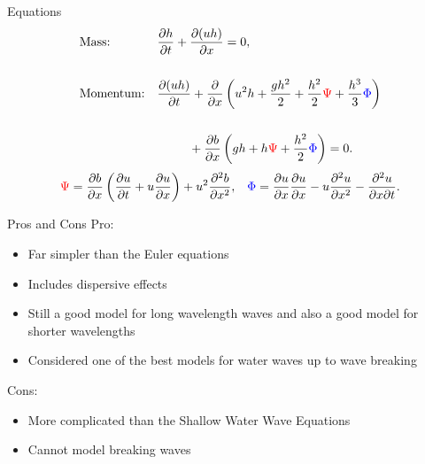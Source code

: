 \documentclass[handout]{beamer}
\begin{document}
\begin{frame}{Equations}
	\begin{subequations}
		\begin{align*}
		&\text{Mass:} && \frac{\partial h}{\partial t} + \dfrac{\partial (uh)}{\partial x} = 0,  \\ \\
		&\text{Momentum:} &&\dfrac{\partial (uh)}{\partial t} + \dfrac{\partial}{\partial x} \left ( u^2h + \dfrac{gh^2}{2} + \dfrac{h^2}{2}{ \color{red}\Psi } + \dfrac{h^3}{3}{ { \color{blue} \Phi } }  \right )   \\ \\& &&\quad \quad \; \; +  \dfrac{\partial b}{\partial x} \left (gh +   h { \color{red}\Psi } + \dfrac{h^2}{2}{ { \color{blue} \Phi } }  \right ) = 0.
		\end{align*}
	\end{subequations}
		\begin{align*}
		&{ \color{red}\Psi }  = \dfrac{\partial b}{\partial x}\left(\dfrac{\partial u}{\partial t} + u\dfrac{\partial u}{\partial x} \right)  + u^2\dfrac{\partial^2 b}{\partial x^2}, &
		{ \color{blue} \Phi }  = \dfrac{\partial u }{\partial x} \dfrac{\partial u}{\partial x} -u \dfrac{\partial^2 u}{\partial x^2}  - \dfrac{\partial^2 u}{\partial x \partial t} .
		\end{align*}
\end{frame}
\begin{frame}{Pros and Cons}
	Pro:
	\begin{itemize}
		\item Far simpler than the Euler equations
		\item Includes dispersive effects
		\item Still a good model for long wavelength waves and also a good model for shorter wavelengths
		\item Considered one of the best models for water waves up to wave breaking
	\end{itemize}
	Cons:
	\begin{itemize}
		\item More complicated than the Shallow Water Wave Equations
		\item Cannot model breaking waves
	\end{itemize}
\end{frame}
\end{document}
